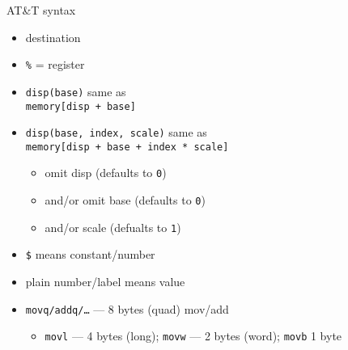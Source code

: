 \begin{frame}{AT\&T syntax}
    \begin{itemize}
    \item destination 
    \item {\tt \%} = register
    \item {\tt disp(base)} same as \\ {\tt memory[disp + base]}
    \item {\tt disp(base, index, scale)} same as \\ {\tt memory[disp + base + index * scale]}
        \begin{itemize}
        \item omit disp (defaults to {\tt 0})
        \item and/or omit base (defaults to {\tt 0})
        \item and/or scale (defualts to {\tt 1})
        \end{itemize}
    \item {\tt \$} means constant/number
    \item plain number/label means value 
    \item {\tt movq/addq/\ldots} --- 8 bytes (quad) mov/add
        \begin{itemize}
            \item {\tt movl} --- 4 bytes (long); {\tt movw} --- 2 bytes (word); {\tt movb} 1 byte
        \end{itemize}
    \end{itemize}
\end{frame}
